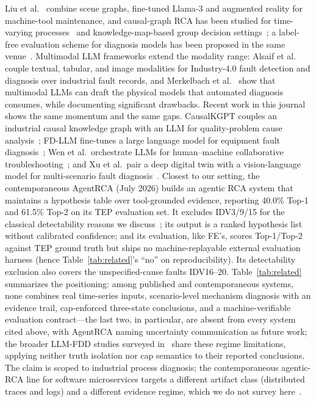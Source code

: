 \documentclass[preprint,12pt]{elsarticle}
\begin{document}
Liu et al.~\cite{liu2025probing} combine scene graphs, fine-tuned Llama-3 and augmented reality for machine-tool maintenance, and causal-graph RCA has been studied for time-varying processes~\cite{liu2025spatial} and knowledge-map-based group decision settings~\cite{yue2023root}; a label-free evaluation scheme for diagnosis models has been proposed in the same venue~\cite{liu2024label}. Multimodal LLM frameworks extend the modality range: Alsaif et al.~\cite{alsaif2024multimodal} couple textual, tabular, and image modalities for Industry-4.0 fault detection and diagnosis over industrial fault records, and Merkelbach et al.~\cite{merkelbach2024multimodal} show that multimodal LLMs can draft the physical models that automated diagnosis consumes, while documenting significant drawbacks.
Recent work in this journal shows the same momentum and the same gaps.  CausalKGPT couples an industrial causal knowledge graph with an LLM for quality-problem cause analysis~\cite{zhou2024causalkgpt}; FD-LLM fine-tunes a large language model for equipment fault diagnosis~\cite{lin2025fdllm}; Wen et al.\ orchestrate LLMs for human--machine collaborative troubleshooting~\cite{wen2025troubleshooting}; and Xu et al.\ pair a deep digital twin with a vision-language model for multi-scenario fault diagnosis~\cite{xu2026digitaltwin}. Closest to our setting, the contemporaneous AgentRCA (July 2026) builds an agentic RCA system that maintains a hypothesis table over tool-grounded evidence, reporting 40.0\% Top-1 and 61.5\% Top-2 on its TEP evaluation set. It excludes IDV3/9/15 for the classical detectability reasons we discuss~\cite{wei2026agentrca}; its output is a ranked hypothesis list without calibrated confidence; and its evaluation, like FE's, scores Top-1/Top-2 against TEP ground truth but ships no machine-replayable external evaluation harness (hence Table~\ref{tab:related}'s ``no'' on reproducibility). Its detectability exclusion also covers the unspecified-cause faults IDV16--20. Table~\ref{tab:related} summarizes the positioning: among published and contemporaneous systems, none combines real time-series inputs, scenario-level mechanism diagnosis with an evidence trail, cap-enforced three-state conclusions, and a machine-verifiable evaluation contract---the last two, in particular, are absent from every system cited above, with AgentRCA naming uncertainty communication as future work; the broader LLM-FDD studies surveyed in~\cite{agentic2026review} share these regime limitations, applying neither truth isolation nor cap semantics to their reported conclusions. The claim is scoped to industrial process diagnosis; the contemporaneous agentic-RCA line for software microservices targets a different artifact class (distributed traces and logs) and a different evidence regime, which we do not survey here~\cite{chen2023automatic}.
\end{document}
